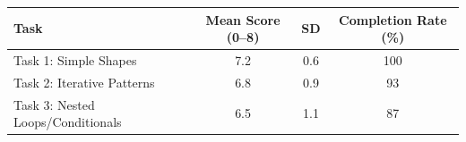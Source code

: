 \begin{table}
\centering

\begin{tabular}{@{}l c c c@{}}
\toprule
\textbf{Task} & \textbf{Mean Score (0--8)} & \textbf{SD} & \textbf{Completion Rate (\%)} \\
\midrule
Task 1: Simple Shapes & 7.2 & 0.6 & 100 \\
Task 2: Iterative Patterns & 6.8 & 0.9 & 93 \\
Task 3: Nested Loops/Conditionals & 6.5 & 1.1 & 87 \\
\bottomrule
\end{tabular}

\end{table}